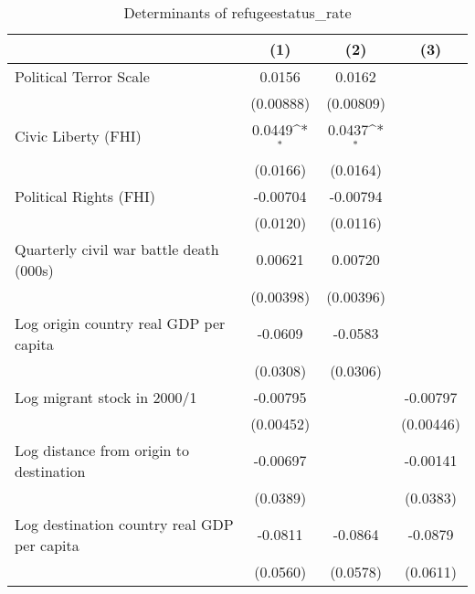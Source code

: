 \begin{table}[htbp]\centering
\def\sym#1{\ifmmode^{#1}\else\(^{#1}\)\fi}
\caption{Determinants of refugeestatus\_rate}
\begin{tabular}{l*{3}{c}}
\hline\hline
                    &\multicolumn{1}{c}{(1)}         &\multicolumn{1}{c}{(2)}         &\multicolumn{1}{c}{(3)}         \\
\hline
Political Terror Scale&      0.0156         &      0.0162         &                     \\
                    &   (0.00888)         &   (0.00809)         &                     \\
[1em]
Civic Liberty (FHI) &      0.0449\sym{*}  &      0.0437\sym{*}  &                     \\
                    &    (0.0166)         &    (0.0164)         &                     \\
[1em]
Political Rights (FHI)&    -0.00704         &    -0.00794         &                     \\
                    &    (0.0120)         &    (0.0116)         &                     \\
[1em]
Quarterly civil war battle death (000s)&     0.00621         &     0.00720         &                     \\
                    &   (0.00398)         &   (0.00396)         &                     \\
[1em]
Log origin country real GDP per capita&     -0.0609         &     -0.0583         &                     \\
                    &    (0.0308)         &    (0.0306)         &                     \\
[1em]
Log migrant stock in 2000/1&    -0.00795         &                     &    -0.00797         \\
                    &   (0.00452)         &                     &   (0.00446)         \\
[1em]
Log distance from origin to destination&    -0.00697         &                     &    -0.00141         \\
                    &    (0.0389)         &                     &    (0.0383)         \\
[1em]
Log destination country real GDP per capita&     -0.0811         &     -0.0864         &     -0.0879         \\
                    &    (0.0560)         &    (0.0578)         &    (0.0611)         \\

\end{tabular}
\end{table}
